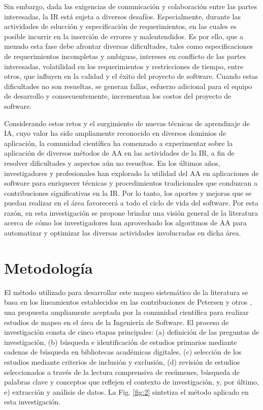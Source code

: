 \documentclass[journal]{IEEEtran}
\begin{document}
Sin embargo, dada las exigencias de comunicación y colaboración entre las partes interesadas, la IR está sujeta a diversos desafíos. Especialmente, durante las actividades de educción y especificación de requerimientos, en las cuales es posible incurrir en la inserción de errores y malentendidos. Es por ello, que a menudo esta fase debe afrontar diversas dificultades, tales como especificaciones de requerimientos incompletas y ambiguas, intereses en conflicto de las partes interesadas, volatilidad en los requerimientos y restricciones de tiempo, entre otros, que influyen en la calidad y el éxito del proyecto de software. Cuando estas dificultades no son resueltas, se generan fallas, esfuerzo adicional para el equipo de desarrollo y consecuentemente, incrementan los costos del proyecto de software. 

Considerando estos retos y el surgimiento de nuevas técnicas de aprendizaje de IA, cuyo valor ha sido ampliamente reconocido en diversos dominios de aplicación, la comunidad científica ha comenzado a experimentar sobre la aplicación de diversos métodos de AA en las actividades de la IR, a fin de resolver dificultades y aspectos aún no resueltos. En los últimos años, investigadores y profesionales han explorado la utilidad del AA en aplicaciones de software para enriquecer técnicas y procedimientos tradicionales que conduzcan a contribuciones significativas en la IR. Por lo tanto, los aportes y mejoras que se puedan realizar en el área favorecerá a todo el ciclo de vida del software. Por esta razón, en esta investigación se propone brindar una visión general de la literatura acerca de cómo los investigadores han aprovechado los algoritmos de AA para automatizar y optimizar las diversas actividades involucradas en dicha área.



\section{Metodología}

El método utilizado para desarrollar este mapeo sistemático de la literatura se basa en los lineamientos establecidos en las contribuciones de Petersen y otros \cite{petersen2008systematic}, una propuesta ampliamente aceptada por la comunidad científica para realizar estudios de mapeo en el área de la Ingeniería de Software. El proceso de investigación consta de cinco etapas principales: (a) definición de las preguntas de investigación, (b) búsqueda e identificación de estudios primarios mediante cadenas de búsqueda en bibliotecas académicas digitales, (c) selección de los estudios mediante criterios de inclusión y exclusión, (d) revisión de estudios seleccionados a través de la lectura comprensiva de resúmenes, búsqueda de palabras clave y conceptos que reflejen el contexto de investigación, y, por último, e) extracción y análisis de datos. La Fig. \ref{fig:2} sintetiza el método aplicado en esta investigación.
\end{document}
